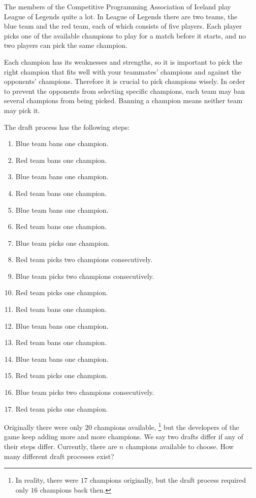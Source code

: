 
The members of the Competitive Programming Association of Iceland play League of Legends quite a lot.
In League of Legends there are two teams, the blue team and the red team, each of which consists of five players.
Each player picks one of the available champions to play for a match before it starts, and no two players can pick the same champion.

Each champion has its weaknesses and strengths, so it is important to pick the right champion that fits well with your teammates' champions and against the opponents' champions.
Therefore it is crucial to pick champions wisely.
In order to prevent the opponents from selecting specific champions, each team may ban several champions from being picked.
Banning a champion means neither team may pick it.

The draft process has the following steps:
\begin{enumerate}
    \item Blue team bans one champion.
    \item Red team bans one champion.
    \item Blue team bans one champion.
    \item Red team bans one champion.
    \item Blue team bans one champion.
    \item Red team bans one champion.
    \item Blue team picks one champion.
    \item Red team picks two champions consecutively.
    \item Blue team picks two champions consecutively.
    \item Red team picks one champion.
    \item Red team bans one champion.
    \item Blue team bans one champion.
    \item Red team bans one champion.
    \item Blue team bans one champion.
    \item Red team picks one champion.
    \item Blue team picks two champions consecutively.
    \item Red team picks one champion.
\end{enumerate}

Originally there were only $20$ champions available,
\footnote{In reality, there were $17$ champions originally, but the draft process required only $16$ champions back then.}
but the developers of the game keep adding more and more champions.
We say two drafts differ if any of their steps differ.
Currently, there are $n$ champions available to choose.
How many different draft processes exist?

